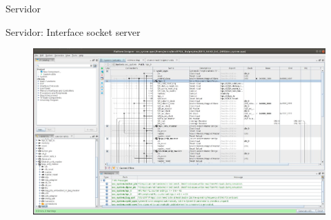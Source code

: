 \documentclass[10pt]{beamer}
\begin{document}
\begin{frame}{Servidor}
    \begin{alertblock}{Servidor: Interface socket server}
		\vspace{0.2cm}
		\begin{figure}[h]
			\begin{center}
				\includegraphics[scale=0.24]{imagens/Platiform.png}\\
			\end{center}
			\label{fig:platform}
		\end{figure}
	\end{alertblock}
\end{frame}



\end{document}
